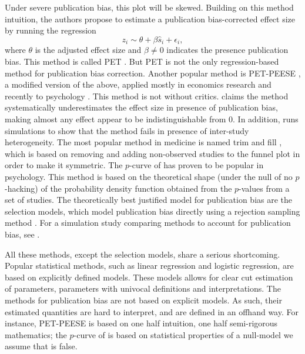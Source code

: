 Under severe publication bias, this plot will be skewed. Building on this method intuition, the authors propose to estimate a publication bias-corrected effect size by running the regression
\[
z_{i}\sim\theta+\beta\widehat{s}_{i}+\epsilon_{i},
\]
where $\theta$ is the adjusted effect size and $\beta\neq0$ indicates the presence publication bias. This method is called PET \parencite{stanley_beyond_2005}. But PET is not the only regression-based method for publication bias
correction. Another popular method is PET-PEESE \parencite{Stanley2014-gx}, a modified version of the above, applied mostly in economics research and recently to psychology \parencite{carter_series_2015}. This method is not without critics. \textcite{gervais_putting_2015} claims the method systematically underestimates the effect size in presence of publication bias, making almost any effect appear to be indistinguishable from $0$. In addition, \textcite{simonsohn_[59]_2017} runs simulations to show that the method fails in presence of inter-study heterogeneity. The most popular method in medicine is named trim and fill \parencite{Duval2000-ct}, which is based on removing and adding non-observed studies to the funnel plot in order to make it symmetric. The $p$-curve of \textcite{simonsohn_p-curve:_2014} has proven to be popular in psychology. This method is based on the theoretical shape (under the null of no $p$-hacking) of the probability density function obtained from the $p$-values from a set of studies.
The theoretically best justified model for publication bias are the selection models, which model publication bias directly using a rejection sampling method \textcite{Hedges1992-ue}. For a simulation study comparing methods to account for publication bias, see \textcite{moreno_assessment_2009,Carter2019-rw}.

All these methods, except the selection models, share a serious shortcoming. Popular statistical methods, such as linear regression and logistic regression, are based on explicitly defined models. These models allows for clear cut estimation of parameters, parameters with univocal definitions and interpretations. The methods for publication bias are not based on explicit models. As such, their estimated quantities are hard to interpret, and are defined in an offhand way. For instance, PET-PEESE is based on one half intuition, one half semi-rigorous mathematics; the $p$-curve of is based on statistical properties of a null-model we assume that is false. 

